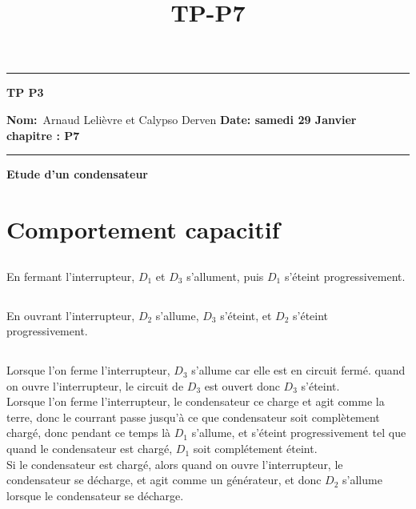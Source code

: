 \documentclass{article}
\title{TP-P7}
\begin{document}
\begin{center}
\hrule
	\vspace{.4cm}
	{\textbf { \large TP P3}}
\end{center}

{\textbf{Nom:}\ Arnaud Lelièvre et Calypso Derven \hspace{\fill} \vspace{0.5cm}}
{\textbf{Date: samedi 29 Janvier}\  \hspace{\fill} \vspace{0.5cm}}
{\textbf{chapitre : P7}\ \hspace{\fill}}
\hrule
\date{}

\vspace{1cm}

\begin{center}
\textbf { \large Etude d'un condensateur}
\end{center} \vspace{0.2cm}

\section{Comportement capacitif}
\subsection{}
En fermant l'interrupteur, $D_1$ et $D_3$ s'allument, puis $D_1$ s'éteint progressivement.
\\

\subsection{}
En ouvrant l'interrupteur, $D_2$ s'allume, $D_3$ s'éteint, et $D_2$ s'éteint progressivement. \\

\subsection{}
Lorsque l'on ferme l'interrupteur, $D_3$ s'allume car elle est en circuit fermé. quand on ouvre l'interrupteur, le circuit de $D_3$ est ouvert donc $D_3$ s'éteint. \\
Lorsque l'on ferme l'interrupteur, le condensateur ce charge et agit comme la terre, donc le courrant passe jusqu'à ce que condensateur soit complètement chargé, donc pendant ce temps là $D_1$ s'allume, et s'éteint progressivement tel que quand le condensateur est chargé, $D_1$ soit complétement éteint. \\
Si le condensateur est chargé, alors quand on ouvre l'interrupteur, le condensateur se décharge, et agit comme un générateur, et donc $D_2$ s'allume lorsque le condensateur se décharge. \\
\end{document}
